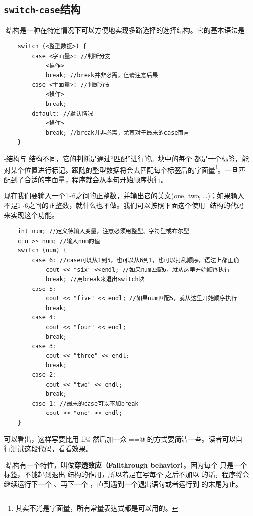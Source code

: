 \subsection*{\texttt{switch}-\texttt{case}结构}
\lstinline@switch@-\lstinline@case@ 结构是一种在特定情况下可以方便地实现多路选择的选择结构。它的基本语法是
\begin{lstlisting}
    switch (<整型数据>) {
        case <字面量>: //判断分支
            <操作>
            break; //break并非必需，但请注意后果
        case <字面量>: //判断分支
            <操作>
            break;
        default: //默认情况
            <操作>
            break; //break并非必需，尤其对于最末的case而言
    }
\end{lstlisting}\par
\lstinline@switch@-\lstinline@case@ 结构与 \lstinline@if@\lstinline@else@ 结构不同，它的判断是通过``匹配''进行的。\lstinline@switch@ 块中的每个 \lstinline@case@ 都是一个标签，能对某个位置进行标记。\lstinline@switch@ 跟随的整型数据将会去匹配每个\lstinline@case@ 标签后的字面量\footnote{其实不光是字面量，所有常量表达式都是可以用的。}。一旦匹配到了合适的字面量，程序就会从本句开始顺序执行。\par
现在我们要输入一个1\~{}6之间的正整数，并输出它的英文(one, two, \ldots)；如果输入不是1\~{}6之间的正整数，就什么也不做。我们可以按照下面这个使用 \lstinline@switch@-\lstinline@case@ 结构的代码来实现这个功能。
\begin{lstlisting}
    int num; //定义待输入变量，注意必须用整型、字符型或布尔型
    cin >> num; //输入num的值
    switch (num) {
        case 6: //case可以从1到6，也可以从6到1，也可以打乱顺序，语法上都正确
            cout << "six" <<endl; //如果num匹配6，就从这里开始顺序执行
            break; //用break来退出switch块
        case 5:
            cout << "five" << endl; //如果num匹配5，就从这里开始顺序执行
            break;
        case 4:
            cout << "four" << endl;
            break;
        case 3:
            cout << "three" << endl;
            break;
        case 2:
            cout << "two" << endl;
            break;
        case 1: //最末的case可以不加break
            cout << "one" << endl;
    }
\end{lstlisting}
可以看出，这样写要比用 \lstinline@else if@ 然后加一众 \lstinline@num==@ 的方式要简洁一些。读者可以自行测试这段代码，看看效果。\par
\lstinline@switch@-\lstinline@case@ 结构有一个特性，叫做\textbf{穿透效应（Fallthrough behavior）}。因为每个 \lstinline@case@ 只是一个标签，不能起到退出 \lstinline@switch@ 结构的作用，所以若是在写每个 \lstinline@case@ 之后不加以 \lstinline@break@ 的话，程序将会继续运行下一个 \lstinline@case@、再下一个 \lstinline@case@，直到遇到一个退出语句或者运行到 \lstinline@switch@ 的末尾为止。\par
